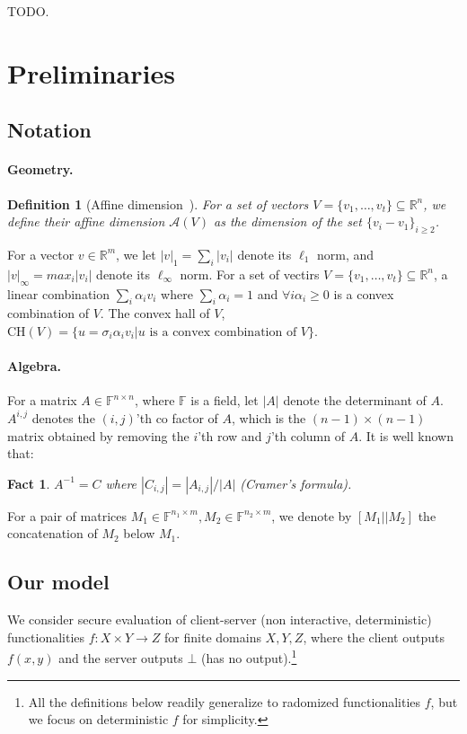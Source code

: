 \documentclass[a4paper]{article}
\newtheorem{definition}{Definition}[section]
\newtheorem{fact}{Fact}
\newcommand{\F}{\mathbb{F}}
\newcommand{\R}{\mathbb{R}}
\newcommand{\affine}[1]{\mathcal{A}(#1)}
\newcommand{\CH}[1]{\text{CH}(#1)}
\begin{document}
TODO.
\section{Preliminaries}


\subsection{Notation} 

\paragraph{Geometry.} 
\begin{definition}[Affine dimension~\cite{Ash14}]
	For a set of vectors $V=\{v_1,\ldots,v_t\}\subseteq\R^n$, we define their affine dimension $\affine{V}$ as the dimension of the set
	$\{v_i-v_1\}_{i\geq 2}$. 
\end{definition}
For a vector $v\in \R^m$, 
we let $|v|_1=\sum_i|v_i|$ denote its $\ell_1$ norm, and $|v|_\infty=max_i |v_i|$ denote its $\ell_\infty$ norm.
For a set of vectirs $V=\{v_1,\ldots,v_t\}\subseteq\R^n$, a linear combination $\sum_i \alpha_iv_i$ where $\sum_i\alpha_i=1$ and $\forall i\alpha_i\geq 0$ is a convex combination of $V$. The convex hall of $V$,
$\CH{V}=\{u=\sigma_i\alpha_iv_i|u\text{ is a convex combination of }V\}$.

\paragraph{Algebra.}

For a matrix $A\in \F^{n\times n}$, where $\F$ is a field, let
$|A|$ denote the determinant of $A$. $A^{i,j}$ denotes the $(i,j)$'th co factor of $A$, which is the $(n-1)\times(n-1)$ matrix obtained by removing the $i$'th row and $j$'th column of $A$.
It is well known that:
\begin{fact}\label{fact-cramer}
	$A^{-1}=C$ where $|C_{i,j}|=|A_{i,j}|/|A|$
	(Cramer's formula).
\end{fact}
For a pair of matrices $M_1\in \F^{n_1\times m},M_2\in \F^{n_2\times m}$, we denote by $[M_1||M_2]$ the concatenation of $M_2$ below $M_1$.


\subsection{Our model}
We consider secure evaluation of client-server (non interactive, deterministic) functionalities $f:X\times Y\rightarrow Z$ for finite domains $X,Y,Z$, where the client outputs $f(x,y)$ and the server outputs $\bot$ (has no output).\footnote{All the definitions below readily generalize to radomized functionalities $f$, but we focus on deterministic $f$ for simplicity.} 
\end{document}
